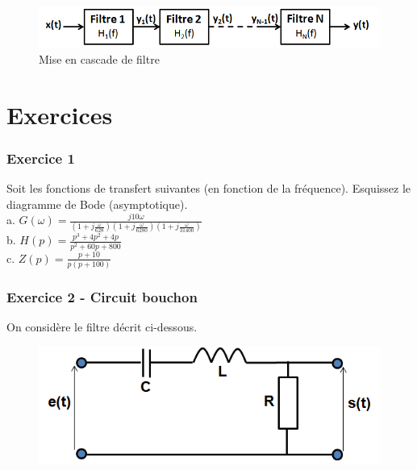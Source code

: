 	
	\begin{figure}[h!]
		\centering
		\includegraphics[scale=0.6]{images/Cascade_filtre.png}
		\caption{Mise en cascade de filtre}	
		\label{Fig:Cascade_filtre} 
	\end{figure}

	
	

	
	
	\section{Exercices }
	
	\subsubsection{Exercice 1}
	Soit les fonctions de transfert suivantes (en fonction de la fréquence). Esquissez le diagramme de Bode (asymptotique). \\
	
	a. $G(\omega)=\frac{j10\omega}{(1+j\frac{\omega}{628})(1+j\frac{\omega}{6280})(1+j\frac{\omega}{31400})}$\\
	
	b. $H(p)=\frac{p^3+4p^2+4p}{p^2+60p+800}$\\
	
	c. $Z(p)=\frac{p+10}{p(p+100)}$\\
	
	
	\subsubsection{Exercice 2 - Circuit bouchon}
	On considère le filtre décrit ci-dessous.
	
	\begin{figure}[h!]
		\centering
		\includegraphics[scale=0.5]{images/circuit_bouchon.png} 
	\end{figure}
	
